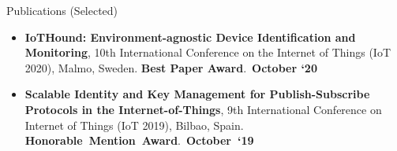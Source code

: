 \documentclass[]{mcdowellcv}
\begin{document}
    	\begin{cvsection}{Publications (Selected)}
		\begin{cvsubsection}{}{}{}	
			\begin{itemize}
				\item \textbf{IoTHound: Environment-agnostic Device Identification and Monitoring}, 10th International Conference on the Internet of Things (IoT 2020), Malmo, Sweden. \mbox{}\hfill\textbf{\color{dartmouthgreen} Best Paper Award}.~\textbf{October `20}
				\item \textbf{Scalable Identity and Key Management for Publish-Subscribe Protocols in the Internet-of-Things}, 9th International Conference on Internet of Things (IoT 2019), Bilbao, Spain. \mbox{}\hfill\textbf{\color{dartmouthgreen} Honorable~Mention~Award}.~\textbf{October~`19}
			\end{itemize}
		\end{cvsubsection}
	\end{cvsection}	
\end{document}
